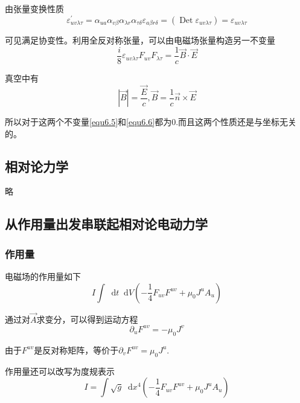 \documentclass[UTF8]{ctexart}
\newcommand*{\dif}{\mathop{}\!\mathrm{d}}
\begin{document}
\noindent 由张量变换性质
\begin{equation}
    \varepsilon_{uv\lambda\tau}^{\prime} = \alpha_{ua}\alpha_{v\beta}\alpha_{\lambda r} \alpha_{\tau \delta}\varepsilon_{a\beta r \delta} = (\operatorname{Det} \varepsilon_{uv\lambda\tau})=\varepsilon_{uv\lambda\tau}
\end{equation}

\noindent 可见满足协变性。利用全反对称张量，可以由电磁场张量构造另一不变量
\begin{equation}
    \frac{i}{8}\varepsilon_{uv\lambda\tau} F_{uv} F_{\lambda \tau} = \frac{1}{c} \vec{B} \cdot \vec{E}\label{equ6.6}
\end{equation}

    真空中有
    \begin{equation}
        |\vec{B}| = \frac{\vec{E}}{c} , \vec{B} = \frac{1}{c} \vec{n} \times \vec{E}
    \end{equation}

\noindent 所以对于这两个不变量\autoref{equ6.5}和\autoref{equ6.6}都为0.而且这两个性质还是与坐标无关的。

    \subsection{相对论力学}
    略
    \subsection{从作用量出发串联起相对论电动力学}
    \subsubsection{作用量}
    电磁场的作用量如下
    \begin{equation}
        I \int \dif t \dif V \left(-\frac{1}{4} F_{uv} F^{uv} + \mu_0 J^{u} A_u\right)
    \end{equation}

\noindent 通过对$\vec{A}$求变分，可以得到运动方程
\begin{equation}
    \partial_u F^{uv} = - \mu_0 J^{v}
\end{equation}

\noindent 由于$F^{uv}$是反对称矩阵，等价于$\partial_v F^{uv} = \mu_0 J^u$.

    作用量还可以改写为度规表示
    \begin{equation}
        I = \int \sqrt{g} \dif x^4 \left(-\frac{1}{4} F_{uv} F^{uv} + \mu_0 J^{u} A_u\right)
    \end{equation}
\end{document}

